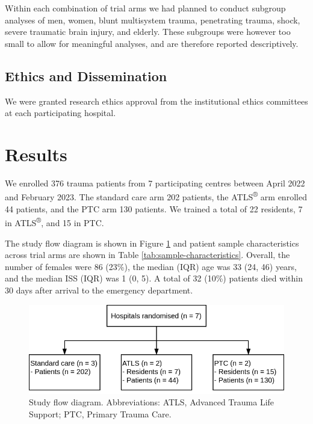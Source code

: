 \documentclass[
]{article}
\begin{document}
Within each combination of trial arms we had planned to conduct subgroup analyses of men, women, blunt multisystem trauma, penetrating trauma, shock, severe traumatic brain injury, and elderly. These subgroups were however too small to allow for meaningful analyses, and are therefore reported descriptively.

\hypertarget{ethics-and-dissemination}{%
\subsection{Ethics and Dissemination}\label{ethics-and-dissemination}}

We were granted research ethics approval from the institutional ethics committees at each participating hospital.

\hypertarget{results}{%
\section{Results}\label{results}}

We enrolled 376 trauma patients from 7 participating centres between April 2022 and February 2023. The standard care arm 202 patients, the ATLS\textsuperscript{®} arm enrolled 44 patients, and the PTC arm 130 patients. We trained a total of 22 residents, 7 in ATLS\textsuperscript{®}, and 15 in PTC.

The study flow diagram is shown in Figure \ref{fig:flow-diagram} and patient sample characteristics across trial arms are shown in Table \ref{tab:sample-characteristics}. Overall, the number of females were 86 (23\%), the median (IQR) age was 33 (24, 46) years, and the median ISS (IQR) was 1 (0, 5). A total of 32 (10\%) patients died within 30 days after arrival to the emergency department.

\begin{figure}
\includegraphics[width=0.5\linewidth]{consort-flow-diagram} \caption{Study flow diagram. Abbreviations: ATLS, Advanced Trauma Life Support; PTC, Primary Trauma Care.}\label{fig:flow-diagram}
\end{figure}
\end{document}
